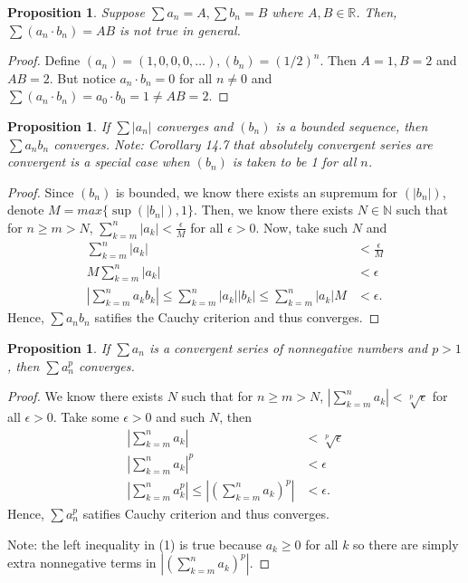 \documentclass{article}
\newtheorem{proposition}[thm]{Proposition}
\begin{document}
\begin{proposition}
    Suppose $\sum a_n=A, \sum b_n=B$  where $A, B \in \mathbb{R}$. Then, $\sum (a_n\cdot b_n)=AB$
    is not true in general.
\end{proposition}
\begin{proof}
    Define $(a_n) = (1, 0, 0, 0, \dots), (b_n) = (1/2)^n$. Then $A=1, B=2$ and $AB = 2$. But notice 
    $a_n\cdot b_n = 0$ for all $n\neq 0$ and $\sum(a_n\cdot b_n) = a_0\cdot b_0 = 1\neq AB = 2$.
\end{proof}

\newpage
\begin{proposition}
    If $\sum|a_n|$ converges and $(b_n)$ is a bounded sequence, then $\sum a_nb_n$ converges.
    Note: Corollary 14.7 that absolutely convergent series are convergent is a special case when 
    $(b_n)$ is taken to be 1 for all $n$.
\end{proposition}
\begin{proof}
    Since $(b_n)$ is bounded, we know there exists an supremum for $(|b_n|)$, denote 
    $M = max\{\sup(|b_n|),1\}$. Then, we know there exists $N\in\mathbb{N}$ such that for $n\ge m>N$, 
    $\sum_{k=m}^n|a_k|<\frac{\epsilon}{M}$ for all $\epsilon>0$. Now, take such $N$ and
    \begin{align*}
        \sum_{k=m}^n|a_k| & < \frac{\epsilon}{M} \\
        M\sum_{k=m}^{n}|a_k| & < \epsilon \\
        \left|\sum_{k=m}^{n}a_kb_k\right| \le \sum_{k=m}^{n}|a_k||b_k| \le \sum_{k=m}^{n}|a_k|M & < \epsilon.
    \end{align*}
    Hence, $\sum a_nb_n$ satifies the Cauchy criterion and thus converges.
\end{proof}

\begin{proposition}
    If $\sum a_n$ is a convergent series of nonnegative numbers and $p>1$, then $\sum a^p_n$ 
    converges.
\end{proposition}
\begin{proof}
    We know there exists $N$ such that for $n\ge m>N$, 
    $\left|\sum_{k=m}^{n}a_k\right|<\sqrt[p]{\epsilon}$ for all $\epsilon>0$.
    Take some $\epsilon>0$ and such $N$, then
    \begin{align}
        \left|\sum_{k=m}^{n}a_k\right| & < \sqrt[p]{\epsilon} \nonumber \\
        \left|\sum_{k=m}^{n}a_k\right|^p & < \epsilon \nonumber \\
        \left|\sum_{k=m}^na_k^p\right| \le \left|\left(\sum_{k=m}^na_k\right)^p\right| & < \epsilon.
    \end{align}
    Hence, $\sum a_n^p$ satifies Cauchy criterion and thus converges.

    Note: the left inequality in (1) is true because $a_k\ge 0$ for all $k$ so there are simply extra 
    nonnegative terms in $\left|\left(\sum_{k=m}^na_k\right)^p\right|$.
\end{proof}
\end{document}
